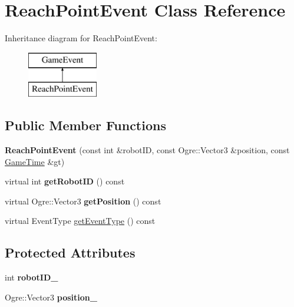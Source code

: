 \hypertarget{class_reach_point_event}{}\section{Reach\+Point\+Event Class Reference}
\label{class_reach_point_event}
Inheritance diagram for Reach\+Point\+Event\+:\begin{figure}[H]
\begin{center}
\leavevmode
\includegraphics[height=2.000000cm]{class_reach_point_event}
\end{center}
\end{figure}
\subsection*{Public Member Functions}
\begin{DoxyCompactItemize}
\item 
{\bfseries Reach\+Point\+Event} (const int \&robot\+ID, const Ogre\+::\+Vector3 \&position, const \hyperlink{class_game_time}{Game\+Time} \&gt)\hypertarget{class_reach_point_event_a7bfff060ec61738a0013820b52fc48dc}{}\label{class_reach_point_event_a7bfff060ec61738a0013820b52fc48dc}

\item 
virtual int {\bfseries get\+Robot\+ID} () const \hypertarget{class_reach_point_event_acd5b5fbf5a5a9c759bb9155691d2119b}{}\label{class_reach_point_event_acd5b5fbf5a5a9c759bb9155691d2119b}

\item 
virtual Ogre\+::\+Vector3 {\bfseries get\+Position} () const \hypertarget{class_reach_point_event_ac2a6044a1f2b699fa23e5b50c7441cbb}{}\label{class_reach_point_event_ac2a6044a1f2b699fa23e5b50c7441cbb}

\item 
virtual Event\+Type \hyperlink{class_reach_point_event_a101793759f1abcc60b97102dc93db349}{get\+Event\+Type} () const 
\end{DoxyCompactItemize}
\subsection*{Protected Attributes}
\begin{DoxyCompactItemize}
\item 
int {\bfseries robot\+I\+D\+\_\+}\hypertarget{class_reach_point_event_a443d78d543d4f68d1504343f59f3027d}{}\label{class_reach_point_event_a443d78d543d4f68d1504343f59f3027d}

\item 
Ogre\+::\+Vector3 {\bfseries position\+\_\+}\hypertarget{class_reach_point_event_a000628c8a9d0c02ee9ea28ed8e3e9ec0}{}\label{class_reach_point_event_a000628c8a9d0c02ee9ea28ed8e3e9ec0}

\end{DoxyCompactItemize}

